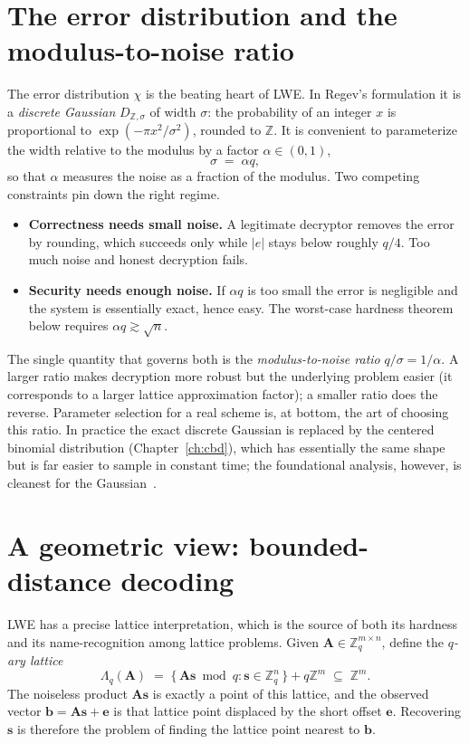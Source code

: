 \section{The error distribution and the modulus-to-noise ratio}
\label{sec:lwe-noise}

The error distribution $\chi$ is the beating heart of LWE. In Regev's formulation it is a \emph{discrete Gaussian} $D_{\mathbb{Z},\sigma}$ of width $\sigma$: the probability of an integer $x$ is proportional to $\exp(-\pi x^2/\sigma^2)$, rounded to $\mathbb{Z}$. It is convenient to parameterize the width relative to the modulus by a factor $\alpha\in(0,1)$,
\[
\sigma \;=\; \alpha q,
\]
so that $\alpha$ measures the noise as a fraction of the modulus. Two competing constraints pin down the right regime.

\begin{itemize}
  \item \textbf{Correctness needs small noise.} A legitimate decryptor removes the error by rounding, which succeeds only while $|e|$ stays below roughly $q/4$. Too much noise and honest decryption fails.
  \item \textbf{Security needs enough noise.} If $\alpha q$ is too small the error is negligible and the system is essentially exact, hence easy. The worst-case hardness theorem below requires $\alpha q \gtrsim \sqrt{n}$.
\end{itemize}

The single quantity that governs both is the \emph{modulus-to-noise ratio} $q/\sigma = 1/\alpha$. A larger ratio makes decryption more robust but the underlying problem easier (it corresponds to a larger lattice approximation factor); a smaller ratio does the reverse. Parameter selection for a real scheme is, at bottom, the art of choosing this ratio. In practice the exact discrete Gaussian is replaced by the centered binomial distribution (Chapter~\ref{ch:cbd}), which has essentially the same shape but is far easier to sample in constant time; the foundational analysis, however, is cleanest for the Gaussian~\cite{micciancioregev2007}.

\section{A geometric view: bounded-distance decoding}
\label{sec:lwe-bdd}

LWE has a precise lattice interpretation, which is the source of both its hardness and its name-recognition among lattice problems. Given $\mathbf{A}\in\mathbb{Z}_q^{m\times n}$, define the \emph{$q$-ary lattice}
\[
\Lambda_q(\mathbf{A}) \;=\; \{\, \mathbf{A}\mathbf{s} \bmod q : \mathbf{s}\in\mathbb{Z}_q^{n} \,\} + q\mathbb{Z}^{m} \;\subseteq\; \mathbb{Z}^{m}.
\]
The noiseless product $\mathbf{A}\mathbf{s}$ is exactly a point of this lattice, and the observed vector $\mathbf{b}=\mathbf{A}\mathbf{s}+\mathbf{e}$ is that lattice point displaced by the short offset $\mathbf{e}$. Recovering $\mathbf{s}$ is therefore the problem of finding the lattice point nearest to $\mathbf{b}$.

